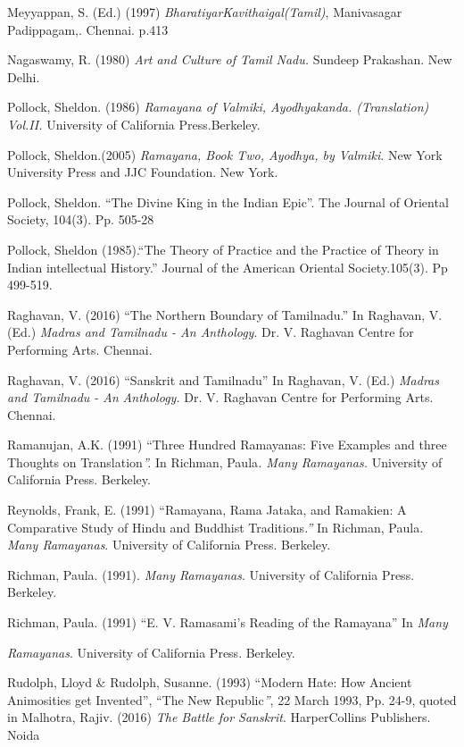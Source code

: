 \begin{thebibliography}{99}
  Meyyappan, S. (Ed.) (1997) \textit{BharatiyarKavithaigal(Tamil)}, Manivasagar Padippagam,. Chennai. p.413

  Nagaswamy, R. (1980) \textit{Art and Culture of Tamil Nadu.} Sundeep Prakashan. New Delhi.

  Pollock, Sheldon. (1986) \textit{Ramayana of Valmiki, Ayodhyakanda. (Translation) Vol.II.} University of California Press.Berkeley.

  Pollock, Sheldon.(2005) \textit{Ramayana, Book Two, Ayodhya, by Valmiki}. New York University Press and JJC Foundation. New York.

  Pollock, Sheldon. “The Divine King in the Indian Epic”. The Journal of Oriental Society, 104(3). Pp. 505-28

  Pollock, Sheldon (1985).“The Theory of Practice and the Practice of Theory in Indian intellectual History.” Journal of the American Oriental Society.105(3). Pp 499-519.

  Raghavan, V. (2016) “The Northern Boundary of Tamilnadu.” In Raghavan, V. (Ed.) \textit{Madras and Tamilnadu - An Anthology}. Dr. V. Raghavan Centre for Performing Arts. Chennai.

  Raghavan, V. (2016) “Sanskrit and Tamilnadu” In Raghavan, V. (Ed.) \textit{Madras and Tamilnadu - An} \textit{Anthology.} Dr. V. Raghavan Centre for Performing Arts. Chennai.

  Ramanujan, A.K. (1991) “Three Hundred Ramayanas: Five Examples and three Thoughts on Translation\textit{”.} In Richman, Paula\textit{. Many Ramayanas.} University of California Press. Berkeley.

  Reynolds, Frank, E. (1991) “Ramayana, Rama Jataka, and Ramakien: A Comparative Study of Hindu and Buddhist Traditions\textit{.”} In Richman, Paula.\textit{ Many Ramayanas}. University of California Press. Berkeley.

  Richman, Paula. (1991). \textit{Many Ramayanas}. University of California Press. Berkeley.

  Richman, Paula. (1991) “E. V. Ramasami's Reading of the Ramayana” In \textit{Many}

  \textit{Ramayanas}. University of California Press. Berkeley.

  Rudolph, Lloyd \& Rudolph, Susanne. (1993) “Modern Hate: How Ancient Animosities get Invented”, “The New Republic\textit{”}, 22 March 1993, Pp. 24-9, quoted in Malhotra, Rajiv. (2016) \textit{The Battle for Sanskrit}. HarperCollins Publishers. Noida


\end{thebibliography}
